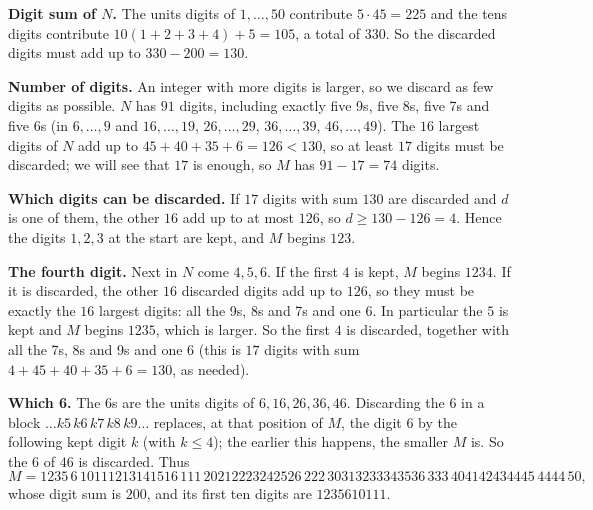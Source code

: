\textbf{Digit sum of $N$.} The units digits of $1,\dots,50$ contribute $5\cdot45=225$ and the tens digits contribute $10(1+2+3+4)+5=105$, a total of $330$. So the discarded digits must add up to $330-200=130$.

\textbf{Number of digits.} An integer with more digits is larger, so we discard as few digits as possible. $N$ has $91$ digits, including exactly five 9s, five 8s, five 7s and five 6s (in $6,\dots,9$ and $16,\dots,19$, $26,\dots,29$, $36,\dots,39$, $46,\dots,49$). The $16$ largest digits of $N$ add up to $45+40+35+6=126<130$, so at least $17$ digits must be discarded; we will see that $17$ is enough, so $M$ has $91-17=74$ digits.

\textbf{Which digits can be discarded.} If $17$ digits with sum $130$ are discarded and $d$ is one of them, the other $16$ add up to at most $126$, so $d\ge130-126=4$. Hence the digits $1,2,3$ at the start are kept, and $M$ begins $123$.

\textbf{The fourth digit.} Next in $N$ come $4,5,6$. If the first $4$ is kept, $M$ begins $1234$. If it is discarded, the other $16$ discarded digits add up to $126$, so they must be exactly the $16$ largest digits: all the 9s, 8s and 7s and one 6. In particular the $5$ is kept and $M$ begins $1235$, which is larger. So the first $4$ is discarded, together with all the 7s, 8s and 9s and one 6 (this is $17$ digits with sum $4+45+40+35+6=130$, as needed).

\textbf{Which 6.} The 6s are the units digits of $6,16,26,36,46$. Discarding the 6 in a block $\ldots k5\,k6\,k7\,k8\,k9\ldots$ replaces, at that position of $M$, the digit $6$ by the following kept digit $k$ (with $k\le4$); the earlier this happens, the smaller $M$ is. So the 6 of $46$ is discarded. Thus
\[
M=1235\,6\,10111213141516\,111\,20212223242526\,222\,30313233343536\,333\,404142434445\,4444\,50 ,
\]
whose digit sum is $200$, and its first ten digits are $\boxed{1235610111}$.
